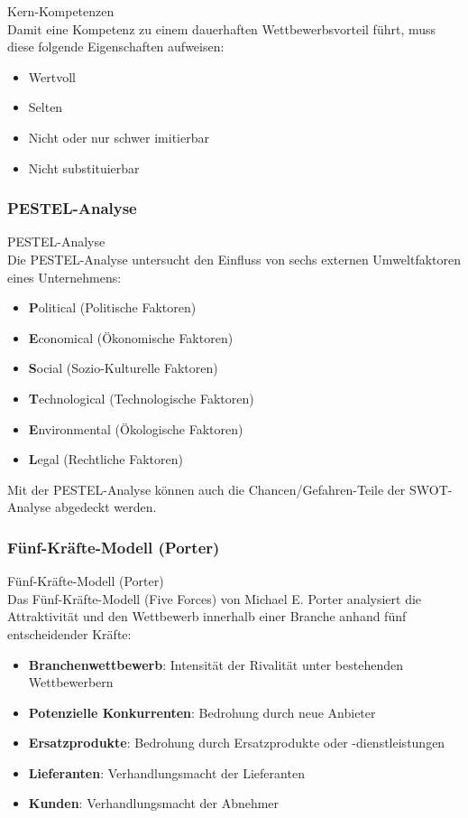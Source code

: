 \begin{concept}{Kern-Kompetenzen}\\
Damit eine Kompetenz zu einem dauerhaften Wettbewerbsvorteil führt, muss diese folgende Eigenschaften aufweisen:
\begin{itemize}
    \item Wertvoll
    \item Selten
    \item Nicht oder nur schwer imitierbar
    \item Nicht substituierbar
\end{itemize}
\end{concept}

\subsubsection{PESTEL-Analyse}

\begin{definition}{PESTEL-Analyse}\\
Die PESTEL-Analyse untersucht den Einfluss von sechs externen Umweltfaktoren eines Unternehmens:
\begin{itemize}
    \item \textbf{P}olitical (Politische Faktoren)
    \item \textbf{E}conomical (Ökonomische Faktoren)
    \item \textbf{S}ocial (Sozio-Kulturelle Faktoren)
    \item \textbf{T}echnological (Technologische Faktoren)
    \item \textbf{E}nvironmental (Ökologische Faktoren)
    \item \textbf{L}egal (Rechtliche Faktoren)
\end{itemize}

Mit der PESTEL-Analyse können auch die Chancen/Gefahren-Teile der SWOT-Analyse abgedeckt werden.
\end{definition}

\subsubsection{Fünf-Kräfte-Modell (Porter)}

\begin{definition}{Fünf-Kräfte-Modell (Porter)}\\
Das Fünf-Kräfte-Modell (Five Forces) von Michael E. Porter analysiert die Attraktivität und den Wettbewerb innerhalb einer Branche anhand fünf entscheidender Kräfte:
\begin{itemize}
    \item \textbf{Branchenwettbewerb}: Intensität der Rivalität unter bestehenden Wettbewerbern
    \item \textbf{Potenzielle Konkurrenten}: Bedrohung durch neue Anbieter
    \item \textbf{Ersatzprodukte}: Bedrohung durch Ersatzprodukte oder -dienstleistungen
    \item \textbf{Lieferanten}: Verhandlungsmacht der Lieferanten
    \item \textbf{Kunden}: Verhandlungsmacht der Abnehmer
\end{itemize}
\end{definition}

